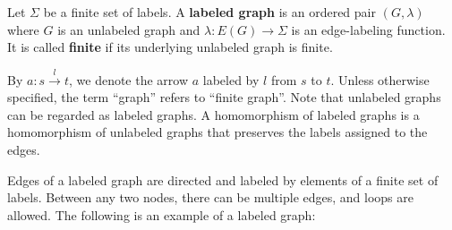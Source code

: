 \begin{definition}
    \label{def:graph}
    Let \(\Sigma\) be a finite set of labels. A \textbf{labeled graph} is an ordered pair \((G,\lambda)\) where \( G \) is an unlabeled graph and \( \lambda : E(G) \rightarrow \Sigma\) is an edge-labeling function. 
    It is called \textbf{finite} if its underlying unlabeled graph is finite.  
\end{definition}
By $a : s\overset{l}{\rightarrow} t$, we denote the arrow $a$ labeled by $l$ from $s$ to $t$. Unless otherwise specified, the term \enquote{graph} refers to \enquote{finite graph}. Note that unlabeled graphs can be regarded as labeled graphs. A homomorphism of labeled graphs is a homomorphism of unlabeled graphs that preserves the labels assigned to the edges.
\begin{example}
    Edges of a labeled graph are directed and labeled by elements of a finite set of labels. Between any two nodes, there can be multiple edges, and loops are allowed. The following is an example of a labeled graph:
        \begin{center}
    \end{center}
\end{example}